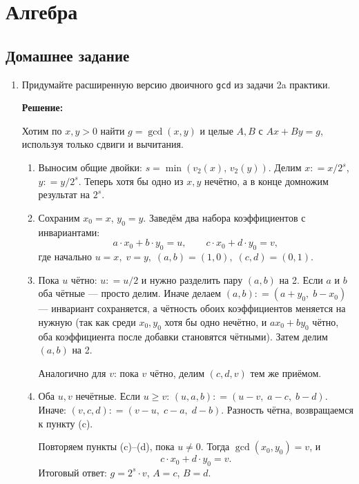 \section{Алгебра}

\subsection{Домашнее задание}
\begin{enumerate}
  \item 
    Придумайте расширенную версию двоичного \texttt{gcd} из задачи 2a практики.

    \textbf{Решение:}

    Хотим по $x, y > 0$ найти $g = \gcd(x,y)$ и целые $A, B$ с $Ax + By = g$,
    используя только сдвиги и вычитания.

    \begin{enumerate}
      \item Выносим общие двойки: $s = \min(v_2(x),\, v_2(y))$.
      Делим $x \mathrel{{:}{=}} x/2^s$, $y \mathrel{{:}{=}} y/2^s$.
      Теперь хотя бы одно из $x, y$ нечётно, а в конце домножим результат на $2^s$.

      \item Сохраним $x_0 = x$, $y_0 = y$.
      Заведём два набора коэффициентов с инвариантами:
      $$a \cdot x_0 + b \cdot y_0 = u, \qquad c \cdot x_0 + d \cdot y_0 = v,$$
      где начально $u = x,\; v = y,\; (a,b) = (1,0),\; (c,d) = (0,1)$.

      \item Пока $u$ чётно: $u \mathrel{{:}{=}} u/2$ и нужно разделить пару $(a,b)$ на 2.
      Если $a$ и $b$ оба чётные --- просто делим.
      Иначе делаем $(a,b) \mathrel{{:}{=}} (a + y_0,\; b - x_0)$ ---
      инвариант сохраняется, а чётность обоих коэффициентов меняется на нужную
      (так как среди $x_0, y_0$ хотя бы одно нечётно, и $a x_0 + b y_0$ чётно,
      оба коэффициента после добавки становятся чётными).
      Затем делим $(a,b)$ на 2.

      Аналогично для $v$: пока $v$ чётно, делим $(c,d,v)$ тем же приёмом.

      \item Оба $u, v$ нечётные. Если $u \ge v$: $(u, a, b) \mathrel{{:}{=}} (u - v,\; a - c,\; b - d)$.
      Иначе: $(v, c, d) \mathrel{{:}{=}} (v - u,\; c - a,\; d - b)$.
      Разность чётна, возвращаемся к пункту (c).

      Повторяем пункты (c)--(d), пока $u \ne 0$.
      Тогда $\gcd(x_0, y_0) = v$, и
      $$c \cdot x_0 + d \cdot y_0 = v.$$
      Итоговый ответ: $g = 2^s \cdot v$, $A = c$, $B = d$.


\end{enumerate}
\end{enumerate}
